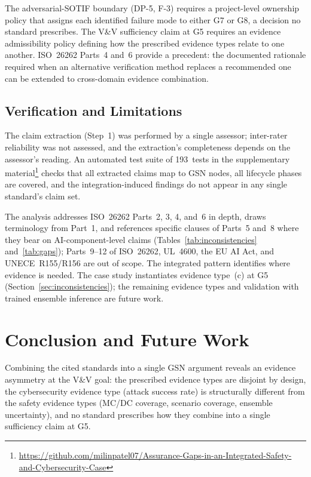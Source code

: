 \documentclass[runningheads]{llncs}
\newcommand{\crev}[1]{\textcolor{blue!75!black}{#1}}
\newcommand{\crev}[1]{#1}
\begin{document}
	\crev{The adversarial-SOTIF boundary (DP-5, F-3) requires a project-level ownership policy that assigns each identified failure mode to either G7 or G8, a decision no standard prescribes.} The V\&V sufficiency claim at G5 requires an evidence admissibility policy defining how the prescribed evidence types relate to one another. ISO~26262 Parts~4 and~6 provide a precedent: the documented rationale required when an alternative verification method replaces a recommended one can be extended to cross-domain evidence combination.
	
	\subsection{Verification and Limitations}
	
	The claim extraction (Step~1) was performed by a single assessor; inter-rater reliability was not assessed, and the extraction's completeness depends on the assessor's reading. An automated test suite of 193~tests in the supplementary material\footnote{{\def\UrlBreaks{\do\/\do\-}\url{https://github.com/milinpatel07/Assurance-Gaps-in-an-Integrated-Safety-and-Cybersecurity-Case}}} checks that all extracted claims map to GSN nodes, all lifecycle phases are covered, and the integration-induced findings do not appear in any single standard's claim set.
	
	The analysis addresses ISO~26262 Parts~2, 3, 4, and~6 in depth, draws terminology from Part~1, and references specific clauses of Parts~5 and~8 where they bear on AI-component-level claims (Tables~\ref{tab:inconsistencies} and~\ref{tab:gaps}); Parts~9--12 of ISO~26262, UL~4600, the EU AI Act, and UNECE~R155/R156 are out of scope. The integrated pattern identifies where evidence is needed. \crev{The case study instantiates evidence type~(c) at G5 (Section~\ref{sec:inconsistencies}); the remaining evidence types and validation with trained ensemble inference are future work.}
	
	\FloatBarrier
	\section{Conclusion and Future Work}
	\label{sec:conclusion}
	
	Combining the cited standards into a single GSN argument reveals an evidence asymmetry at the V\&V goal: the prescribed evidence types are disjoint by design, the cybersecurity evidence type (attack success rate) is structurally different from the safety evidence types (MC/DC coverage, scenario coverage, ensemble uncertainty), and no standard prescribes how they combine into a single sufficiency claim at G5.
	
\end{document}

